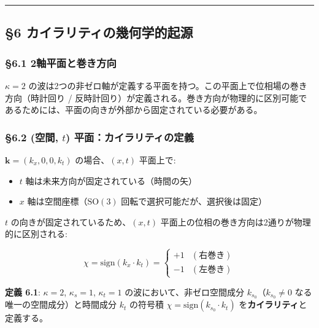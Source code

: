 \documentclass[
  a4paper,11pt]{ltjsarticle}
\providecommand{\tightlist}{%
  \setlength{\itemsep}{0pt}\setlength{\parskip}{0pt}}
\theoremstyle{definition}
\theoremstyle{remark}
\begin{document}
\begin{center}\rule{0.5\linewidth}{0.5pt}\end{center}

\subsection{§6
カイラリティの幾何学的起源}\label{ux30abux30a4ux30e9ux30eaux30c6ux30a3ux306eux5e7eux4f55ux5b66ux7684ux8d77ux6e90}

\subsubsection{§6.1
2軸平面と巻き方向}\label{ux8ef8ux5e73ux9762ux3068ux5dfbux304dux65b9ux5411}

\(\kappa = 2\)
の波は2つの非ゼロ軸が定義する平面を持つ。この平面上で位相場の巻き方向（時計回り
/
反時計回り）が定義される。巻き方向が物理的に区別可能であるためには、平面の向きが外部から固定されている必要がある。

\subsubsection{\texorpdfstring{§6.2 (空間, \(t\))
平面：カイラリティの定義}{§6.2 (空間, t) 平面：カイラリティの定義}}\label{ux7a7aux9593-t-ux5e73ux9762ux30abux30a4ux30e9ux30eaux30c6ux30a3ux306eux5b9aux7fa9}

\(\mathbf{k} = (k_x, 0, 0, k_t)\) の場合、\((x, t)\) 平面上で:

\begin{itemize}
\tightlist
\item
  \(t\) 軸は未来方向が固定されている（時間の矢）
\item
  \(x\) 軸は空間座標（\(\mathrm{SO}(3)\)
  回転で選択可能だが、選択後は固定）
\end{itemize}

\(t\) の向きが固定されているため、\((x, t)\)
平面上の位相の巻き方向は2通りが物理的に区別される:

\[\chi = \mathrm{sign}(k_x \cdot k_t) = \begin{cases} +1 & (\text{右巻き}) \\ -1 & (\text{左巻き}) \end{cases}\]

\textbf{定義 6.1}: \(\kappa = 2\), \(\kappa_s = 1\), \(\kappa_t = 1\)
の波において、非ゼロ空間成分 \(k_{s_0}\)（\(k_{s_0} \neq 0\)
なる唯一の空間成分）と時間成分 \(k_t\) の符号積
\(\chi = \mathrm{sign}(k_{s_0} \cdot k_t)\)
を\textbf{カイラリティ}と定義する。
\end{document}
